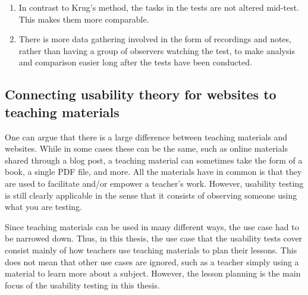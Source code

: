 \begin{enumerate}
	\item In contrast to Krug's method, the tasks in the tests are not altered mid-test. This makes them more comparable.
	\item There is more data gathering involved in the form of recordings and notes, rather than having a group of observers watching the test, to make analysis and comparison easier long after the tests have been conducted.
\end{enumerate}

\subsection{Connecting usability theory for websites to teaching materials}

One can argue that there is a large difference between teaching materials and websites. While in some cases these can be the same, such as online materials shared through a blog post, a teaching material can sometimes take the form of a book, a single PDF file, and more. All the materials have in common is that they are used to facilitate and/or empower a teacher's work. However, usability testing is still clearly applicable in the sense that it consists of observing someone using what you are testing.

Since teaching materials can be used in many different ways, the use case had to be narrowed down. Thus, in this thesis, the use case that the usability tests cover consist mainly of how teachers use teaching materials to plan their lessons. This does not mean that other use cases are ignored, such as a teacher simply using a material to learn more about a subject. However, the lesson planning is the main focus of the usability testing in this thesis.


